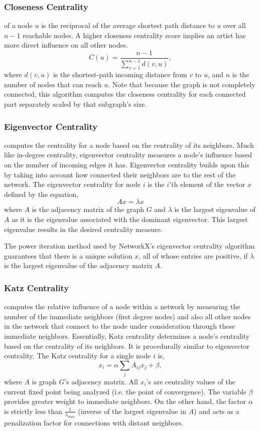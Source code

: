 \documentclass[pageno]{jpaper}
\begin{document}
\subsubsection{Closeness Centrality}
of a node $u$ is the reciprocal of the average shortest path distance to $u$ over all $n-1$ reachable nodes. A higher closeness centrality score implies an artist has more direct influence on all other nodes.
\begin{equation}
C(u) = \frac{n - 1}{\sum_{v=1}^{n-1} d(v, u)},
\end{equation}
where $d(v, u)$ is the shortest-path incoming distance from $v$ to $u$, and $n$ is the number of nodes that can reach $u$. Note that because the graph is not completely connected, this algorithm computes the closeness centrality for each connected part separately scaled by that subgraph's size.
\subsubsection{Eigenvector Centrality}
computes the centrality for a node based on the centrality of its neighbors. Much like in-degree centrality, eigenvector centrality measures a node's influence based on the number of incoming edges it has. Eigenvector centrality builds upon this by taking into account how connected their neighbors are to the rest of the network.
The eigenvector centrality for node $i$ is the $i$'th element of the vector $x$ defined by the equation,
\begin{equation}
Ax = \lambda x
\end{equation}
where $A$ is the adjacency matrix of the graph $G$ and $\lambda$ is the largest eigenvalue of $A$ as it is the eigenvalue associated with the dominant eigenvector. This largest eigenvalue results in the desired centrality measure.

The power iteration method used by NetworkX's eigenvector centrality algorithm guarantees that there is a unique solution $x$, all of whose entries are positive, if $\lambda$ is the largest eigenvalue of the adjacency matrix $A$. 
\subsubsection{Katz Centrality}
computes the relative influence of a node within a network by measuring the number of the immediate neighbors (first degree nodes) and also all other nodes in the network that connect to the node under consideration through these immediate neighbors. Essentially, Katz centrality determines a node's centrality based on the centrality of its neighbors. It is procedurally similar to eigenvector centrality. The Katz centrality for a single node $i$ is, 
\begin{equation}
x_i = \alpha \sum_{j} A_{ij} x_j + \beta,
\end{equation} where $A$ is graph $G$'s adjacency matrix. All $x_i$'s are centrality values of the current fixed point being analyzed (i.e. the point of convergence). The variable $\beta$ provides greater weight to immediate neighbors. On the other hand, the factor $\alpha$ is strictly less than $\frac{1}{\lambda_{max}}$ (inverse of the largest eigenvalue in $A$) and acts as a penalization factor for connections with distant neighbors. 
\end{document}
